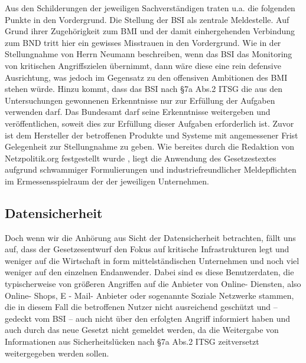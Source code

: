 \documentclass[a4paper,letterpaper,twocolumn,10pt,ngerman]{article}
\begin{document}
Aus den Schilderungen der jeweiligen Sachverständigen traten u.a. die folgenden Punkte in den Vordergrund. Die Stellung der BSI als zentrale Meldestelle. Auf Grund ihrer Zugehörigkeit zum BMI und der damit einhergehenden Verbindung zum BND tritt hier ein gewisses Misstrauen in den Vordergrund. Wie in der Stellungnahme von Herrn Neumann \cite[vlg.][S. 4]{NeuCCC15}  beschreiben, wenn das BSI das Monitoring von kritischen Angriffszielen übernimmt, dann wäre diese eine rein defensive Ausrichtung, was jedoch im Gegensatz zu den offensiven Ambitionen des BMI stehen würde. Hinzu kommt, dass das BSI nach §7a Abs.2 ITSG die aus den Untersuchungen gewonnenen Erkenntnisse nur zur Erfüllung der Aufgaben verwenden darf. Das Bundesamt darf seine Erkenntnisse weitergeben und veröffentlichen, soweit dies zur Erfüllung dieser Aufgaben erforderlich ist. Zuvor ist dem Hersteller der betroffenen Produkte und Systeme mit angemessener Frist Gelegenheit zur Stellungnahme zu geben. Wie bereites durch die Redaktion von Netzpolitik.org festgestellt wurde \cite{Bis15}, liegt die Anwendung des Gesetzestextes aufgrund schwammiger Formulierungen und industriefreundlicher Meldepflichten im Ermessensspielraum der der jeweiligen Unternehmen. 

\subsection{Datensicherheit}
\label{sub:Datensicherheit}
Doch wenn wir die Anhörung aus Sicht der Datensicherheit betrachten, fällt uns auf, dass der Gesetzesentwurf den Fokus auf kritische Infrastrukturen legt und weniger auf die Wirtschaft in form mittelständischen Unternehmen und noch viel weniger auf den einzelnen Endanwender. Dabei sind es diese Benutzerdaten, die typischerweise von größeren Angriffen auf die Anbieter
von Online- Diensten, also Online- Shops, E - Mail- Anbieter oder sogenannte Soziale Netzwerke stammen, die in diesem Fall die betroffenen Nutzer nicht ausreichend geschützt und – gedeckt vom BSI – auch nicht über den erfolgten Angriff
informiert haben und auch durch das neue Gesetzt nicht gemeldet werden, da die Weitergabe von Informationen  aus Sicherheitslücken nach §7a Abs.2 ITSG zeitversetzt weitergegeben werden sollen.
\end{document}
